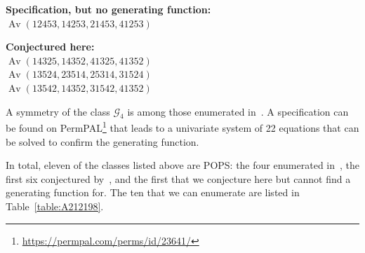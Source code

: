 \documentclass[11pt]{article}
\theoremstyle{definition}
\numberwithin{theorem}{section}
\numberwithin{question}{section}
\numberwithin{definition}{section}
\numberwithin{example}{section}
\numberwithin{remark}{section}
\newcommand{\Av}{\operatorname{Av}}
\newcommand{\GG}{\mathcal{G}}
\newcommand{\pplink}[1]{\footnote{\url{https://permpal.com/perms/id/#1/}}}
\begin{document}
\begin{multicols}{2}
\textbf{Specification, but no generating function:}\\
\hspace*{0.2in} $\Av(12453, 14253, 21453, 41253)$

\textbf{Conjectured here:}\\
\hspace*{0.2in} $\Av(14325, 14352, 41325, 41352)$\\
\hspace*{0.2in} $\Av(13524, 23514, 25314, 31524)$\\
\hspace*{0.2in} $\Av(13542, 14352, 31542, 41352)$
\end{multicols}

A symmetry of the class $\GG_4$ is among those enumerated in~\cite{chen:length-5-patts-and-inv-201-210}. A specification can be found on PermPAL\pplink{23641} that leads to a univariate system of 22 equations that can be solved to confirm the generating function.

In total, eleven of the classes listed above are POPS: the four enumerated in~\cite{chen:length-5-patts-and-inv-201-210}, the first six conjectured by~\cite{chen:length-5-patts-and-inv-201-210}, and the first that we conjecture here but cannot find a generating function for. The ten that we can enumerate are listed in Table~\ref{table:A212198}.
\end{document}
